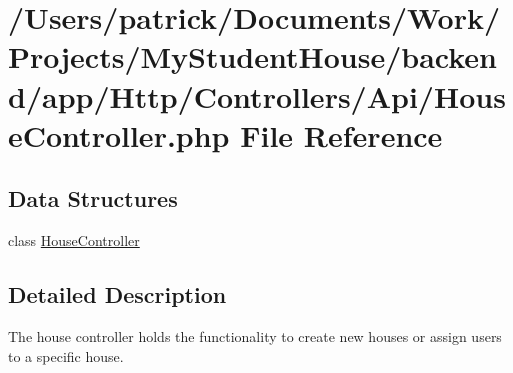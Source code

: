\hypertarget{_house_controller_8php}{}\section{/\+Users/patrick/\+Documents/\+Work/\+Projects/\+My\+Student\+House/backend/app/\+Http/\+Controllers/\+Api/\+House\+Controller.php File Reference}
\label{_house_controller_8php}
\subsection*{Data Structures}
\begin{DoxyCompactItemize}
\item 
class \mbox{\hyperlink{class_app_1_1_http_1_1_controllers_1_1_a_p_i_1_1_house_controller}{House\+Controller}}
\end{DoxyCompactItemize}


\subsection{Detailed Description}
The house controller holds the functionality to create new houses or assign users to a specific house. 